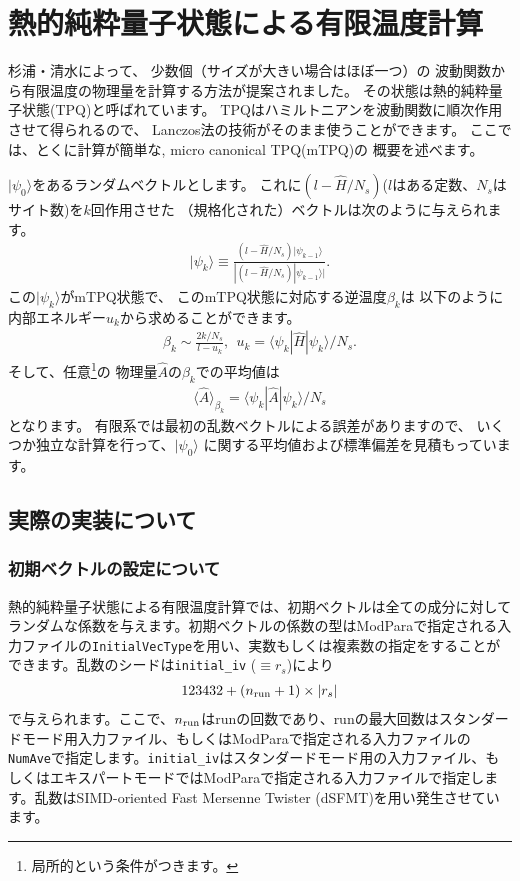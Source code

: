 \section{熱的純粋量子状態による有限温度計算}
\label{Ch:TPQ}
杉浦・清水によって、
少数個（サイズが大きい場合はほぼ一つ）の
波動関数から有限温度の物理量を計算する方法が提案されました\cite{Sugiura2012}。
その状態は熱的純粋量子状態(TPQ)と呼ばれています。
TPQはハミルトニアンを波動関数に順次作用させて得られるので、
Lanczos法の技術がそのまま使うことができます。
ここでは、とくに計算が簡単な, micro canonical TPQ(mTPQ)の
概要を述べます。

$|\psi_{0}\rangle$をあるランダムベクトルとします。
これに$(l-\hat{H}/N_{s})$($l$はある定数、$N_{s}$はサイト数)を$k$回作用させた
（規格化された）ベクトルは次のように与えられます。
\begin{align}
|\psi_{k}\rangle \equiv \frac{(l-\hat{H}/N_{s})|\psi_{k-1}\rangle}{|(l-\hat{H}/N_{s})|\psi_{k-1}\rangle|}.
\end{align}
この$|\psi_{k}\rangle$がmTPQ状態で、
このmTPQ状態に対応する逆温度$\beta_{k}$は
以下のように内部エネルギー$u_{k}$から求めることができます。
\begin{align}
\beta_{k}\sim \frac{2k/N_{s}}{l-u_{k}},~~
u_{k} = \langle \psi_{k}|\hat{H}|\psi_{k}\rangle/N_{s}.
\end{align}
そして、任意\footnote{局所的という条件がつきます。}の
物理量$\hat{A}$の$\beta_{k}$での平均値は
\begin{align}
\langle \hat{A}\rangle_{\beta_{k}} =  \langle \psi_{k}|\hat{A}|\psi_{k}\rangle/N_{s}
\end{align}
となります。
有限系では最初の乱数ベクトルによる誤差がありますので、
いくつか独立な計算を行って、$|\psi_{0}\rangle$
に関する平均値および標準偏差を見積もっています。

\subsection{実際の実装について}
\subsubsection*{初期ベクトルの設定について}
熱的純粋量子状態による有限温度計算では、初期ベクトルは全ての成分に対してランダムな係数を与えます。初期ベクトルの係数の型はModParaで指定される入力ファイルの\verb|InitialVecType|を用い、実数もしくは複素数の指定をすることができます。乱数のシードは\verb|initial_iv| ($\equiv r_s$)により
\begin{align}
123432+(n_{\rm run}+1)\times  |r_s|
\end{align}
で与えられます。ここで、$n_{\rm run}$はrunの回数であり、runの最大回数はスタンダードモード用入力ファイル、もしくはModParaで指定される入力ファイルの\verb|NumAve|で指定します。\verb|initial_iv|はスタンダードモード用の入力ファイル、もしくはエキスパートモードではModParaで指定される入力ファイルで指定します。乱数はSIMD-oriented Fast Mersenne Twister (dSFMT)を用い発生させています\cite{Mutsuo2008}。

